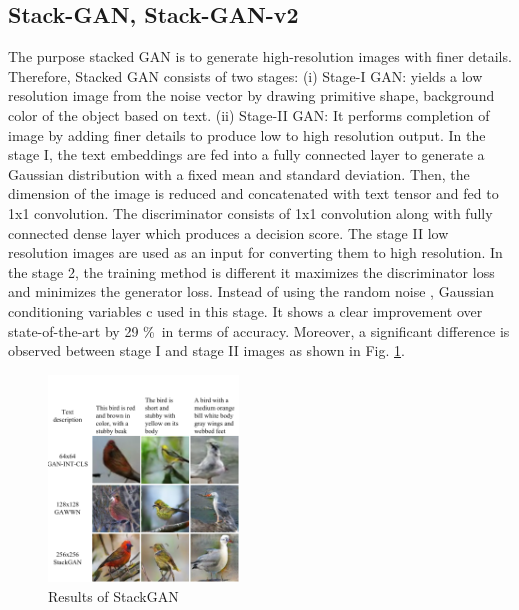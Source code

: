 \documentclass[conference]{IEEEtran}
\begin{document}
	\subsection{Stack-GAN, Stack-GAN-v2}
	The purpose stacked GAN is to generate high-resolution images with finer details. Therefore, Stacked GAN consists of two stages: (i) Stage-I GAN: yields a low resolution image from the noise vector by drawing primitive shape, background color of the object based on text. (ii) Stage-II GAN: It performs completion of image by adding finer details to produce low to high resolution output. In the stage I, the text embeddings are fed into a fully connected layer to generate a Gaussian distribution with a fixed mean and standard deviation. Then, the dimension of the image is reduced and concatenated with text tensor and fed to 1x1 convolution. The discriminator consists of 1x1 convolution along with fully connected dense layer which produces a decision score. The stage II low resolution images are used as an input for converting them to high resolution. In the stage 2, the training method is different it maximizes the discriminator loss and minimizes the generator loss. Instead of using the random noise , Gaussian conditioning variables c used in this stage. It shows a clear improvement over state-of-the-art by 29 \%\ in terms of accuracy. Moreover, a significant difference is observed between stage I and stage II images as shown in Fig. \ref{gan_stack}.
	
	\begin{figure}[htbp]
		\centering
		\includegraphics[width=0.45\textwidth]{stackGAN.png}
		\caption{Results of StackGAN \cite{b5}}
		\label{gan_stack}
	\end{figure}
	
\end{document}
